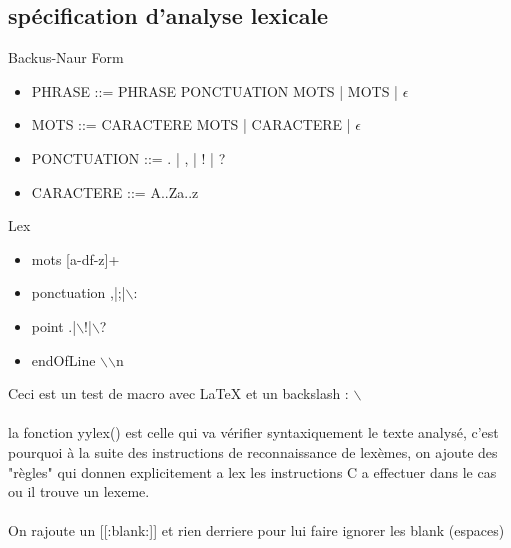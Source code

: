 \documentclass{article}
\newcommand{\test}{Ceci est un test de macro avec LaTeX et un backslash : $\backslash$}
\begin{document}
\subsection{spécification d'analyse lexicale}
Backus-Naur Form
\begin{itemize}
\item PHRASE ::= PHRASE PONCTUATION MOTS | MOTS | $\epsilon$
\item MOTS ::= CARACTERE MOTS | CARACTERE | $\epsilon$
\item PONCTUATION ::= . | , | ! | ?
\item CARACTERE ::= {A..Za..z} 
\end{itemize}

Lex
\begin{itemize}
\item mots [a-df-z]+
\item ponctuation ,|;|$\backslash$:
\item point .|$\backslash$!|$\backslash$?
\item endOfLine $\backslash$$\backslash$n
\end{itemize}
\test\\\\
\newpage
la fonction yylex() est celle qui va vérifier syntaxiquement le texte analysé, c'est pourquoi à la suite des instructions de reconnaissance de lexèmes, on ajoute des "règles" qui donnen explicitement a lex les instructions C a effectuer dans le cas ou il trouve un lexeme.\\\\On rajoute un [[:blank:]] et rien derriere pour lui faire ignorer les blank (espaces)
\end{document}
